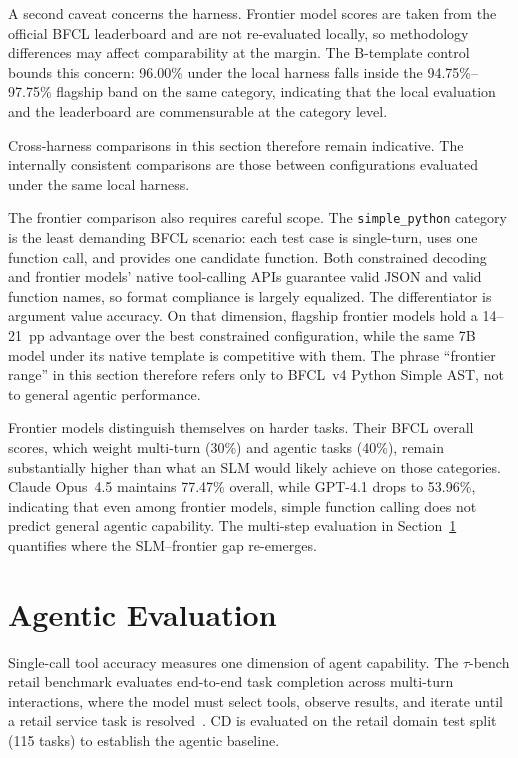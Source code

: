 A second caveat concerns the harness. Frontier model scores are taken
from the official BFCL leaderboard and are not re-evaluated locally, so
methodology differences may affect comparability at the margin. The
B-template control bounds this concern: 96.00\% under the local harness
falls inside the 94.75\%--97.75\% flagship band on the same category,
indicating that the local evaluation and the leaderboard are
commensurable at the category level.

Cross-harness comparisons in this section therefore remain indicative.
The internally consistent comparisons are those between configurations
evaluated under the same local harness.

The frontier comparison also requires careful scope. The \texttt{simple\_python} category is the least demanding BFCL scenario: each test case is single-turn, uses one function call, and provides one candidate function. Both constrained decoding and frontier models' native tool-calling APIs guarantee valid JSON and valid function names, so format compliance is largely equalized. The differentiator is argument value accuracy. On that dimension, flagship frontier models hold a 14--21~pp advantage over the best constrained configuration, while the same 7B model under its native template is competitive with them. The phrase ``frontier range'' in this section therefore refers only to BFCL~v4 Python Simple AST, not to general agentic performance.

Frontier models distinguish themselves on harder tasks. Their BFCL overall
scores, which weight multi-turn (30\%) and agentic tasks (40\%), remain
substantially higher than what an SLM would likely achieve on those
categories. Claude Opus~4.5 maintains 77.47\% overall, while GPT-4.1
drops to 53.96\%, indicating that even among frontier models, simple
function calling does not predict general agentic capability. The
multi-step evaluation in Section~\ref{sec:tau-bench} quantifies where
the SLM--frontier gap re-emerges.

\section{Agentic Evaluation}
\label{sec:tau-bench}

Single-call tool accuracy measures one dimension of agent capability.
The $\tau$-bench retail benchmark evaluates end-to-end task completion
across multi-turn interactions, where the model must select tools, observe
results, and iterate until a retail service task is
resolved~\cite{taubench2024}. CD is evaluated on the retail domain
test split (115 tasks) to establish the agentic baseline.

